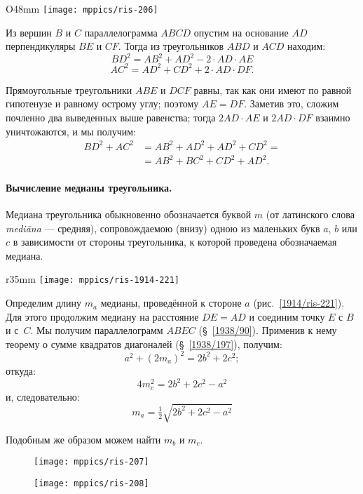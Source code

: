 \begin{wrapfigure}{O}{48mm}
\centering
\texttt{[image: mppics/ris-206]}
\caption{}\label{1938/ris-206}
\end{wrapfigure}

Из вершин $B$ и $C$ параллелограмма $ABCD$ опустим на основание $AD$ перпендикуляры $BE$ и $CF$.
Тогда из треугольников $ABD$ и $ACD$ находим:
\[BD^2=AB^2+AD^2-2\cdot AD\cdot AE\]
\[AC^2=AD^2+CD^2+2\cdot AD\cdot  DF.\]

Прямоугольные треугольники $ABE$ и $DCF$ равны, так как они имеют по равной гипотенузе и равному острому углу;
поэтому $AE=DF$.
Заметив это, сложим почленно два выведенных выше равенства;
тогда $2AD\cdot  AE$ и $2AD\cdot  DF$ взаимно уничтожаются, и мы получим:
\begin{align*}
BD^2+AC^2&=AB^2+AD^2+AD^2+CD^2=
\\
&=AB^2+BC^2+CD^2+AD^2.
\end{align*}

\paragraph{Вычисление медианы треугольника.}\label{1914/241}
Медиана треугольника обыкновенно обозначается буквой $m$ (от латинского слова \emph{mediāna} — средняя), сопровождаемою (внизу) одною из маленьких букв $a$, $b$ или $c$ в зависимости от стороны треугольника, к которой проведена обозначаемая медиана.

\begin{wrapfigure}{r}{35mm}
\centering
\texttt{[image: mppics/ris-1914-221]}
\caption{}\label{1914/ris-221}
\end{wrapfigure}

Определим длину $m_a$ медианы, проведённой к стороне $a$ (рис.~\ref{1914/ris-221}).
Для этого продолжим медиану на расстояние $DE=AD$ и соединим точку $E$ с $B$ и с~$C$.
Мы получим параллелограмм $ABEC$ (§~\ref{1938/90}).
Применив к нему теорему о сумме квадратов диагоналей (§~\ref{1938/197}), получим:
\[a^2+(2m_a)^2=2b^2+2c^2;\]
откуда: 
\[4m_c^2=2b^2+2c^2-a^2\]
и, следовательно:
\[m_a=\tfrac 12\sqrt{2b^2+2c^2-a^2}\]

Подобным же образом можем найти $m_b$ и $m_c$.

\begin{figure}[!ht]
\begin{minipage}{.48\textwidth}
\centering
\texttt{[image: mppics/ris-207]}
\end{minipage}
\hfill
\begin{minipage}{.48\textwidth}
\centering
\texttt{[image: mppics/ris-208]}
\end{minipage}

\medskip

\begin{minipage}{.48\textwidth}
\centering
\caption{}\label{1938/ris-207}
\end{minipage}
\hfill
\begin{minipage}{.48\textwidth}
\centering
\caption{}\label{1938/ris-208}
\end{minipage}
\vskip-4mm
\end{figure}

